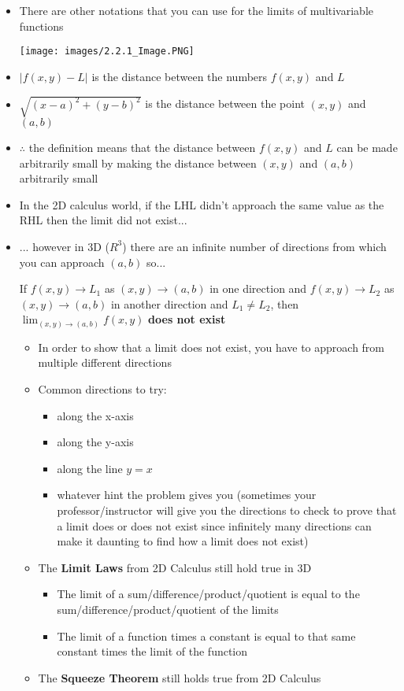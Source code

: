 \documentclass{package/notes}
\begin{document}
\begin{itemize}
	\item There are other notations that you can use for the limits of multivariable functions
		\begin{figure*}[h]
			\begin{center}
				\texttt{[image: images/2.2.1\_Image.PNG]}
			\end{center}
		\end{figure*}
	\item $|f(x,y)-L|$ is the distance between the numbers $f(x,y)$ and $L$
	\item $\sqrt{(x-a)^2+(y-b)^2}$ is the distance between the point $(x,y)$ and $(a,b)$
	\item $\therefore$ the definition means that the distance between $f(x,y)$ and $L$ can be made arbitrarily small by making the distance between $(x,y)$ and $(a,b)$ arbitrarily small
	\item In the 2D calculus world, if the LHL didn't approach the same value as the RHL then the limit did not exist...
	\item ... however in 3D ($R^3$) there are an infinite number of directions from which you can approach $(a,b)$ so...

\begin{proposition}
	If $f(x,y) \to L_1$ as $(x,y)\to (a,b)$ in one direction and $f(x,y) \to L_2$ as $(x,y)\to (a,b)$ in another direction and $L_1 \ne L_2$, then $\lim_{(x,y)\to(a,b)}f(x,y)$ \textbf{does not exist}
\end{proposition}

\begin{itemize}
	\item In order to show that a limit does not exist, you have to approach from multiple different directions
	\item Common directions to try:
	\begin{itemize}
		\item along the x-axis
		\item along the y-axis
		\item along the line $y=x$
		\item whatever hint the problem gives you (sometimes your professor/instructor will give you the directions to check to prove that a limit does or does not exist since infinitely many directions can make it daunting to find how a limit does not exist)
	\end{itemize}
	\item The \textbf{Limit Laws} from 2D Calculus still hold true in 3D
	\begin{itemize}
		\item The limit of a sum/difference/product/quotient is equal to the sum/difference/product/quotient of the limits
		\item The limit of a function times a constant is equal to that same constant times the limit of the function
	\end{itemize}
	\item The \textbf{Squeeze Theorem} still holds true from 2D Calculus
	\end{itemize}
\end{itemize}
\end{document}

